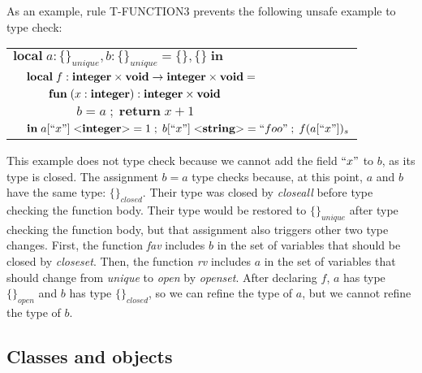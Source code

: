 As an example, rule \textsc{T-FUNCTION3} prevents the following unsafe example to type check:
\begin{center}
\begin{tabular}{llll}
\multicolumn{4}{l}{$\mathbf{local} \; a:\{\}_{unique}, b:\{\}_{unique} = \{\}, \{\} \; \mathbf{in}$}\\
& \multicolumn{3}{l}{$\mathbf{local} \; f:\mathbf{integer} \times \mathbf{void} \rightarrow \mathbf{integer} \times \mathbf{void} =$}\\
& & \multicolumn{2}{l}{$\mathbf{fun} \; (x:\mathbf{integer}):\mathbf{integer} \times \mathbf{void}$}\\
& & & \multicolumn{1}{l}{$b = a \;;\; \mathbf{return} \; x + 1$}\\
& \multicolumn{3}{l}{$\mathbf{in} \; a[``x"] \; {<}\mathbf{integer}{>} = 1 \;;\; b[``x"] \; {<}\mathbf{string}{>} = ``foo" \;;\; f(a[``x"])_{s}$}
\end{tabular}
\end{center}

This example does not type check because we cannot add the field
$``x"$ to $b$, as its type is closed.
The assignment $b = a$ type checks because, at this point,
$a$ and $b$ have the same type: $\{\}_{closed}$.
Their type was closed by \emph{closeall} before type checking
the function body.
Their type would be restored to $\{\}_{unique}$ after type checking
the function body, but that assignment also triggers other two type changes.
First, the function \emph{fav} includes $b$ in the set of variables
that should be closed by \emph{closeset}.
Then, the function \emph{rv} includes $a$ in the set of variables
that should change from \emph{unique} to \emph{open} by \emph{openset}.
After declaring $f$, $a$ has type $\{\}_{open}$ and $b$ has type $\{\}_{closed}$,
so we can refine the type of $a$, but we cannot refine the type of $b$.

\subsection{Classes and objects}
\label{sec:cao}

